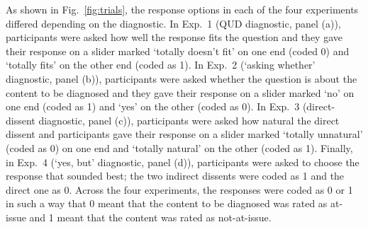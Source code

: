 \documentclass[times,linguex,xcolor]{glossa}
\begin{document}
  As shown in Fig.~\ref{fig:trials}, the response options in each of the four experiments differed depending on the diagnostic. In Exp.~1 (QUD diagnostic, panel (a)), participants were asked how well the response fits the question and they gave their response on a slider marked `totally doesn't fit' on one end (coded 0) and `totally fits' on the other end (coded as 1). In Exp.~2 (`asking whether' diagnostic, panel (b)), participants were asked whether the question is about the content to be diagnosed and they gave their response on a slider marked `no' on one end (coded as 1) and `yes' on the other (coded as 0). In Exp.~3 (direct-dissent diagnostic, panel (c)), participants were asked how natural the direct dissent and participants gave their response on a slider marked `totally unnatural' (coded as 0) on one end and `totally natural' on the other (coded as 1). Finally, in Exp.~4 (`yes, but' diagnostic, panel (d)), participants were asked to choose the response that sounded best; the two indirect dissents were coded as 1 and the direct one as 0. Across the four experiments, the responses were coded as 0 or 1 in such a way that 0 meant that the content to be diagnosed was rated as at-issue and 1 meant that the content was rated as not-at-issue.
\end{document}
